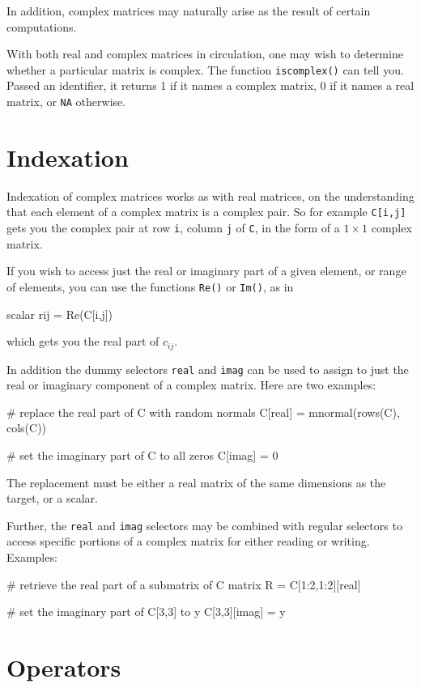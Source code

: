 \documentclass{article}
\begin{document}
In addition, complex matrices may naturally arise as the result of
certain computations.

With both real and complex matrices in circulation, one may wish to
determine whether a particular matrix is complex. The function
\texttt{iscomplex()} can tell you. Passed an identifier, it returns 1
if it names a complex matrix, 0 if it names a real matrix, or
\texttt{NA} otherwise.

\section{Indexation}

Indexation of complex matrices works as with real matrices, on the
understanding that each element of a complex matrix is a complex
pair. So for example \texttt{C[i,j]} gets you the complex pair at row
\texttt{i}, column \texttt{j} of \texttt{C}, in the form of a
$1 \times 1$ complex matrix.

If you wish to access just the real or imaginary part of a given
element, or range of elements, you can use the functions \texttt{Re()}
or \texttt{Im()}, as in
\begin{code}
scalar rij = Re(C[i,j])
\end{code}
which gets you the real part of $c_{ij}$.

In addition the dummy selectors \texttt{real} and \texttt{imag} can be
used to assign to just the real or imaginary component of a complex
matrix. Here are two examples:
\begin{code}
# replace the real part of C with random normals
C[real] = mnormal(rows(C), cols(C))

# set the imaginary part of C to all zeros
C[imag] = 0
\end{code}
The replacement must be either a real matrix of the same dimensions as
the target, or a scalar.

Further, the \texttt{real} and \texttt{imag} selectors may be combined
with regular selectors to access specific portions of a complex matrix
for either reading or writing. Examples:
\begin{code}
# retrieve the real part of a submatrix of C
matrix R = C[1:2,1:2][real]

# set the imaginary part of C[3,3] to y
C[3,3][imag] = y
\end{code}

\section{Operators}
\label{sec:ops}
\end{document}
